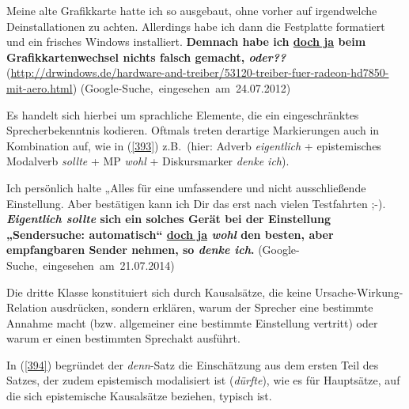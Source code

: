 \begin{exe}
	\ex\label{392}

	Meine alte Grafikkarte hatte ich so ausgebaut, ohne vorher auf irgendwelche Deinstallationen zu achten. Allerdings habe ich dann die Festplatte 			formatiert und ein frisches Windows installiert. \textbf{Demnach habe ich \underline{doch ja} beim Grafikkartenwechsel nichts falsch gemacht, 				\textit{oder??}}
	\newline
	{\scriptsize(\url{http://drwindows.de/hardware-and-treiber/53120-treiber-fuer-radeon-hd7850-mit-aero.html})}
	\newline
	\hbox{}\hfill\hbox{(Google-Suche, eingesehen am 24.07.2012)}
	\newline
	\hbox{}\hfill\hbox{\citet[201]{Mueller2014a}}
\end{exe}		     
Es handelt sich hierbei um sprachliche Elemente, die ein eingeschränktes Sprecherbekenntnis kodieren. Oftmals treten derartige Markierungen auch in Kombination auf, wie in (\ref{393}) z.B.\ (hier: Adverb \textit{eigentlich} + epistemisches Modalverb \textit{sollte} + MP \textit{wohl} +  Diskursmarker \textit{denke ich}).\largerpage[2]
\begin{exe}
	\ex\label{393}
	Ich persönlich halte „Alles für eine umfassendere und nicht ausschließende Einstellung. Aber bestätigen kann ich Dir das erst nach vielen Testfahrten ;-). \textbf{\textit{Eigentlich sollte} sich ein solches Gerät bei der Einstellung „Sendersuche: automatisch“ \underline{doch ja} \textit{wohl} den besten, aber empfangbaren Sender nehmen, so \textit{denke ich}.}
	\newline
	\hbox{}\hfill\hbox{(Google-Suche, eingesehen am 21.07.2014)}
	\newline
	\hbox{}\hfill\hbox{\citet[208]{Mueller2017b}}
\end{exe}
Die dritte Klasse konstituiert sich durch Kausalsätze, die keine Ursache-Wirkung-Relation ausdrücken, sondern erklären, warum der Sprecher eine bestimmte Annahme macht (bzw. allgemeiner eine bestimmte Einstellung vertritt) oder warum er einen bestimmten Sprechakt ausführt. 

In (\ref{394}) begründet der \textit{denn}-Satz die Einschätzung aus dem ersten Teil des Satzes, der zudem epistemisch modalisiert ist (\textit{dürfte}), wie es für Hauptsätze, auf die sich epistemische Kausalsätze beziehen, typisch ist. 
        

